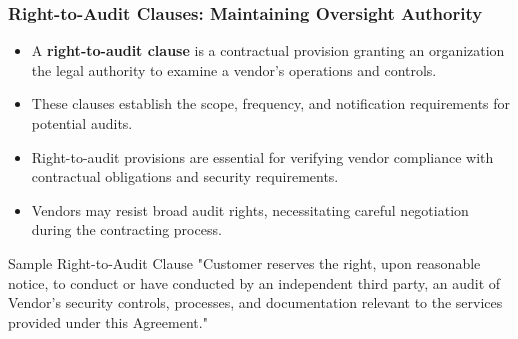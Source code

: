 \documentclass{beamer}
\begin{document}
\begin{frame}
    \frametitle{Right-to-Audit Clauses: Maintaining Oversight Authority}
    
    \begin{itemize}
        \item A \textbf{right-to-audit clause} is a contractual provision granting an organization the legal authority to examine a vendor's operations and controls.
        \item These clauses establish the scope, frequency, and notification requirements for potential audits.
        \item Right-to-audit provisions are essential for verifying vendor compliance with contractual obligations and security requirements.
        \item Vendors may resist broad audit rights, necessitating careful negotiation during the contracting process.
    \end{itemize}
    
    \begin{exampleblock}{Sample Right-to-Audit Clause}
        \scriptsize
        "Customer reserves the right, upon reasonable notice, to conduct or have conducted by an independent third party, an audit of Vendor's security controls, processes, and documentation relevant to the services provided under this Agreement."
    \end{exampleblock}
\end{frame}
\end{document}
